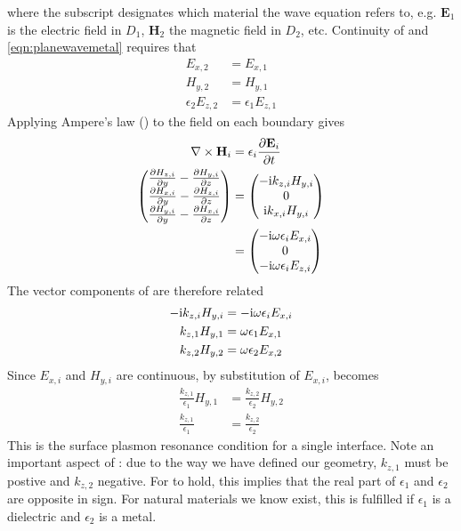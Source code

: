 where the subscript designates which material the wave equation refers to,
e.g. $\mathbf{E}_1$ is the electric field in $D_1$, $\mathbf{H}_2$
the magnetic field in $D_2$, etc. Continuity of
 and
\ref{eqn:planewavemetal} requires that
\begin{align}
E_{x,2}&=E_{x,1}\\
H_{y,2}&=H_{y,1}\\
\epsilon_2 E_{z,2}&=\epsilon_1 E_{z,1}
\end{align}
Applying Ampere's law () to the field on 
each boundary gives
\begin{align}
\nabla \times \mathbf{H}_i &= \epsilon_i \frac{\partial \mathbf{E}_i}{\partial t}\\
\begin{pmatrix}
\frac{\partial H_{z,i}}{\partial y} - \frac{\partial H_{y,i}}{\partial z}\\
\frac{\partial H_{x,i}}{\partial y} - \frac{\partial H_{z,i}}{\partial z}\\
\frac{\partial H_{y,i}}{\partial y} - \frac{\partial H_{x,i}}{\partial z}
\end{pmatrix}
&= \begin{pmatrix}
-{\mathrm{i}} k_{z,i} H_{y,i}\\
0\\
{\mathrm{i}} k_{x,i} H_{y,i}
\end{pmatrix}
\\
&= \begin{pmatrix}
-{\mathrm{i}} \omega \epsilon_i E_{x,i}\\
0\\
-{\mathrm{i}} \omega \epsilon_i E_{z,i}
\end{pmatrix}
\label{eqn:vectordisp}
\end{align}
The vector components of  are therefore related 
\begin{align}
-{\mathrm{i}} k_{z,i} H_{y,i} &= -{\mathrm{i}} \omega \epsilon_i E_{x,i}\\
k_{z,1} H_{y,1} &= \omega \epsilon_1 E_{x,1}\\
k_{z,2} H_{y,2} &= \omega \epsilon_2 E_{x,2}
\label{eqn:spderivsteptwo}
\end{align}
Since $E_{x,i}$ and $H_{y,i}$ are continuous,
by substitution of $E_{x,i}$,  becomes
\begin{align}
\frac{k_{z,1}}{\epsilon_1}H_{y,1}&=\frac{k_{z,2}}{\epsilon_2}H_{y,2}\\ 
\frac{k_{z,1}}{\epsilon_1}&=\frac{k_{z,2}}{\epsilon_2} 
\label{eqn:sprcondition}
\end{align}
This is the surface plasmon resonance condition for a single interface.  Note an important aspect
of :  due to the way we have defined our
geometry, $k_{z,1}$ must be postive and $k_{z,2}$ negative.  For
 to hold, this implies that the real part of
$\epsilon_1$ and $\epsilon_2$ are opposite in sign.  For natural materials we know
exist, this is fulfilled if $\epsilon_1$ is a dielectric and $\epsilon_2$
is a metal.
